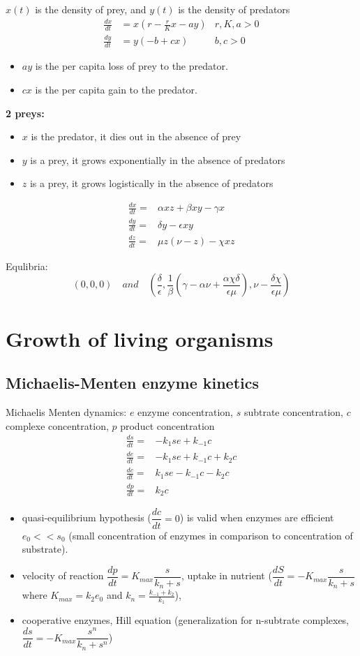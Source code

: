 $x(t)$ is the density of prey, and $y(t)$ is the density of predators
$$
\begin{array}{lll}
\frac{dx}{dt}&=x(r-\frac{r}{K}x -ay)&r,K,a >0\\
\frac{dy}{dt}&=y(-b+cx)& b,c>0
\end{array}
$$
\begin{itemize}
\item $ay$ is the per capita loss of prey to the predator.
\item $cx$ is the per capita gain to the predator.
\end{itemize}


{\bf 2 preys:}
\begin{itemize}
\item $x$ is the predator, it dies out in the absence of prey
\item $y$ is a prey, it grows exponentially in the absence of predators
\item $z$ is a prey, it grows logistically in the absence of predators
\end{itemize}


$$
\begin{array}{cl}
\frac{dx}{dt}=&\alpha xz+\beta xy -\gamma x\\
\frac{dy}{dt}=&\delta y-\epsilon xy\\
\frac{dz}{dt}=&\mu z(\nu-z) - \chi xz
\end{array}
$$

Equlibria:
$$(0,0,0) \quad and \quad (\frac{\delta}{\epsilon},\frac{1}{\beta}(\gamma -\alpha \nu +\frac{\alpha\chi\delta}{\epsilon \mu}),\nu-\frac{\delta \chi}{\epsilon \mu})$$



\section{Growth of living organisms}
\subsection{Michaelis-Menten enzyme kinetics}
Michaelis Menten dynamics: $e$ enzyme concentration, $s$ subtrate concentration, $c$ complexe concentration, $p$ product concentration
\begin{align*}
\frac{ds}{dt}=&-k_1se+k_{-1}c\\
\frac{de}{dt}=&-k_1se+k_{-1}c+k_2c\\
\frac{dc}{dt}=&k_1se-k_{-1}c-k_2c\\
\frac{dp}{dt}=&k_2c
\end{align*}
\begin{itemize}
\item quasi-equilibrium hypothesis ($\dfrac{dc}{dt}=0$) is valid when enzymes are efficient  $e_0<<s_0$ (small concentration of enzymes in comparison to concentration of substrate). 
\item velocity of reaction $\dfrac{dp}{dt}=K_{max}\dfrac{s}{k_n+s}$, uptake in nutrient ($\dfrac{dS}{dt}=-K_{max}\dfrac{s}{k_n+s}$ where $K_{max}=k_2e_0$ and $k_n=\frac{k_{-1}+k_2}{k_1}$), 
\item cooperative enzymes, Hill equation (generalization for n-subtrate complexes, $\dfrac{ds}{dt}=-K_{max}\dfrac{s^n}{k_n+s^n}$)
\end{itemize}

